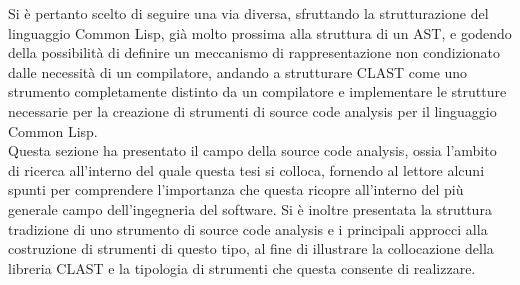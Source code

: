 Si è pertanto scelto di seguire una via diversa, sfruttando la strutturazione
del linguaggio Common Lisp, già molto prossima alla struttura di un AST, e
godendo della possibilità di definire un meccanismo di rappresentazione non
condizionato dalle necessità di un compilatore, andando a strutturare CLAST
come uno strumento completamente distinto da un compilatore e implementare le
strutture necessarie per la creazione di strumenti di source code analysis per
il linguaggio Common Lisp.\\

Questa sezione ha presentato il campo della source code analysis, ossia
l'ambito di ricerca all'interno del quale questa tesi si colloca, fornendo al
lettore alcuni spunti per comprendere l'importanza che questa ricopre
all'interno del più generale campo dell'ingegneria del software. Si è inoltre
presentata la struttura tradizione di uno strumento di source code analysis e i
principali approcci alla costruzione di strumenti di questo tipo, al fine di
illustrare la collocazione della libreria CLAST e la tipologia di strumenti che
questa consente di realizzare.





